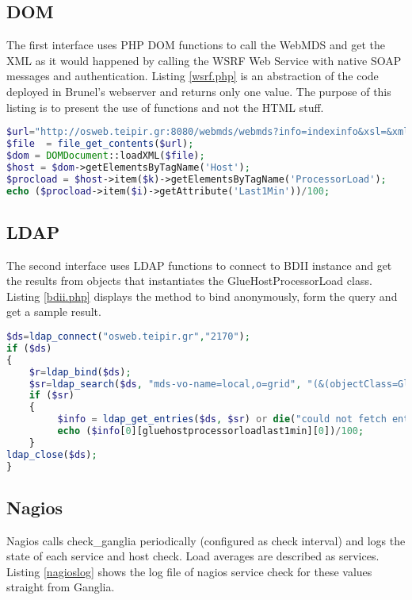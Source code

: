 \subsection{DOM}

The first interface uses PHP \ac{DOM} functions to call the WebMDS and get the XML as it would happened by calling the WSRF Web Service with native SOAP messages and authentication. Listing \ref{wsrf.php} is an abstraction of the code deployed in Brunel's webserver and returns only one value. The purpose of this listing is to present the use of functions and not the HTML stuff.

\begin{lstlisting}[language=PHP,caption=PHP DOM call to WebMDS,label=wsrf.php]
$url="http://osweb.teipir.gr:8080/webmds/webmds?info=indexinfo&xsl=&xmlSource.indexinfo.param.xpathQuery=%2F%2F*[local-name%28%29%3D%27Host%27]";
$file  = file_get_contents($url);
$dom = DOMDocument::loadXML($file);
$host = $dom->getElementsByTagName('Host');
$procload = $host->item($k)->getElementsByTagName('ProcessorLoad');
echo ($procload->item($i)->getAttribute('Last1Min'))/100;
\end{lstlisting}

\subsection{LDAP}

The second interface uses LDAP functions to connect to BDII instance and get the results from objects that instantiates the GlueHostProcessorLoad class. Listing \ref{bdii.php} displays the method to bind anonymously, form the query and get a sample result.

\begin{lstlisting}[language=PHP,caption=PHP LDAP call to BDII,label=bdii.php]
$ds=ldap_connect("osweb.teipir.gr","2170");
if ($ds)
{
    $r=ldap_bind($ds);
    $sr=ldap_search($ds, "mds-vo-name=local,o=grid", "(&(objectClass=GlueHostProcessorLoad))");
    if ($sr)
    {
         $info = ldap_get_entries($ds, $sr) or die("could not fetch entries");
         echo ($info[0][gluehostprocessorloadlast1min][0])/100;
    }
ldap_close($ds);
}
\end{lstlisting}

\subsection{Nagios}

Nagios calls check\_ganglia periodically (configured as check interval) and logs the state of each service and host check. Load averages are described as services. Listing \ref{nagioslog} shows the log file of nagios service check for these values straight from Ganglia.

